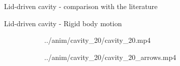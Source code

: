 \documentclass{beamer}  %
\begin{document}
\begin{frame}{Lid-driven cavity - comparison with the literature}
    \begin{figure}
        \centering
        
    \end{figure}
\end{frame}

\begin{frame}{Lid-driven cavity - Rigid body motion}
    \begin{figure}
        \centering
        \begin{subfigure}[t]{0.48\textwidth}
            \movie[width=\textwidth, height=1.042\textwidth, autostart, loop]{} {../anim/cavity_20/cavity_20.mp4}
        \end{subfigure}
        \begin{subfigure}[t]{0.48\textwidth}
            \movie[width=\textwidth, height=1.042\textwidth, autostart, loop]{} {../anim/cavity_20/cavity_20_arrows.mp4}
        \end{subfigure}
    \end{figure}
\end{frame}
\end{document}
